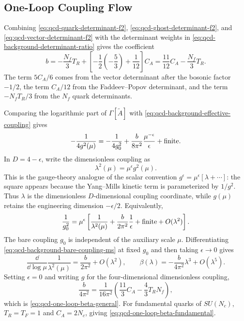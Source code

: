 \subsection{One-Loop Coupling Flow}
\label{subsec:qcd-background-one-loop-coupling-flow}

Combining \eqref{eq:qcd-quark-determinant-f2},
\eqref{eq:qcd-ghost-determinant-f2}, and
\eqref{eq:qcd-vector-determinant-f2} with the determinant weights in
\eqref{eq:qcd-background-determinant-ratio} gives the coefficient
\begin{equation}
  b
  =
  -\frac{N_f}{3}T_R
  +
  \left[
    -\frac12\left(-\frac53\right)+\frac1{12}
  \right]C_A
  =
  \frac{11}{12}C_A-\frac{N_f}{3}T_R .
  \label{eq:qcd-background-b-coefficient}
\end{equation}
The term \(5C_A/6\) comes from the vector determinant after the bosonic
factor \(-1/2\), the term \(C_A/12\) from the Faddeev--Popov determinant, and
the term \(-N_fT_R/3\) from the \(N_f\) quark determinants.

Comparing the logarithmic part of \(\Gamma[\widetilde A]\) with
\eqref{eq:qcd-background-effective-coupling} gives
\begin{equation}
  -\frac1{4g^2(\mu)}
  =
  -\frac1{4g_0^2}
  +
  \frac{b}{8\pi^2}\frac{\mu^{-\epsilon}}{\epsilon}
  +\hbox{finite}.
  \label{eq:qcd-background-bare-renormalized-relation}
\end{equation}
In \(D=4-\epsilon\), write the dimensionless coupling as
\[
  \lambda^2(\mu)=\mu^\epsilon g^2(\mu).
\]
This is the gauge-theory analogue of the scalar convention
\(g^\epsilon=\mu^\epsilon[\lambda+\cdots]\): the square appears because the
Yang--Mills kinetic term is parameterized by \(1/g^2\).  Thus \(\lambda\) is
the dimensionless \(D\)-dimensional coupling coordinate, while \(g(\mu)\)
retains the engineering dimension \(-\epsilon/2\).
Equivalently,
\begin{equation}
  \frac1{g_0^2}
  =
  \mu^\epsilon
  \left[
    \frac1{\lambda^2(\mu)}
    +
    \frac{b}{2\pi^2}\frac1{\epsilon}
    +\hbox{finite}
    +O(\lambda^2)
  \right].
  \label{eq:qcd-background-bare-coupling-ms}
\end{equation}
The bare coupling \(g_0\) is independent of the auxiliary scale \(\mu\).
Differentiating \eqref{eq:qcd-background-bare-coupling-ms} at fixed \(g_0\)
and then taking \(\epsilon\to0\) gives
\begin{equation}
  \frac{\dd}{\dd\log\mu}\frac1{\lambda^2(\mu)}
  =
  \frac{b}{2\pi^2}+O(\lambda^2),
  \qquad
  \beta(\lambda)
  =
  -\frac{b}{4\pi^2}\lambda^3+O(\lambda^5).
  \label{eq:qcd-background-beta-lambda}
\end{equation}
Setting \(\epsilon=0\) and writing \(g\) for the four-dimensional
dimensionless coupling,
\[
  \frac{b}{4\pi^2}
  =
  \frac1{16\pi^2}
  \left(
    \frac{11}{3}C_A-\frac{4}{3}T_RN_f
  \right),
\]
which is \eqref{eq:qcd-one-loop-beta-general}.  For fundamental quarks of
\(SU(N_c)\), \(T_R=T_F=1\) and \(C_A=2N_c\), giving
\eqref{eq:qcd-one-loop-beta-fundamental}.


